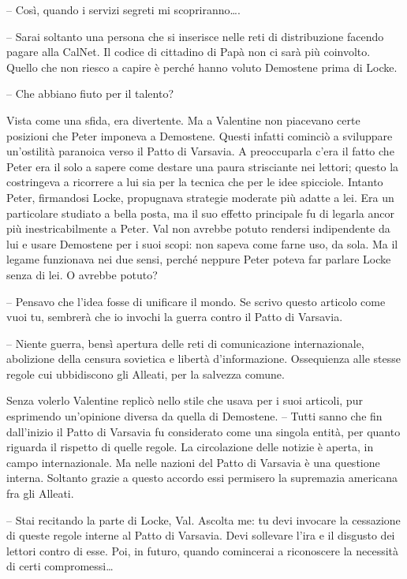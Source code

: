 {-- Così, quando i servizi segreti mi scopriranno\ldots.}

{-- Sarai soltanto una persona che si inserisce nelle reti di
	distribuzione facendo pagare alla CalNet. Il codice di cittadino di Papà
	non ci sarà più coinvolto. Quello che non riesco a capire è perché hanno
	voluto Demostene prima di Locke.}

{-- Che abbiano fiuto per il talento?}

{Vista come una sfida, era divertente. Ma a Valentine non piacevano
	certe posizioni che Peter imponeva a Demostene. Questi infatti cominciò
	a sviluppare un'ostilità paranoica verso il Patto di Varsavia. A
	preoccuparla c'era il fatto che Peter era il solo a sapere come destare
	una paura strisciante nei lettori; questo la costringeva a ricorrere a
	lui sia per la tecnica che per le idee spicciole. Intanto Peter,
	firmandosi Locke, propugnava strategie moderate più adatte a lei. Era un
	particolare studiato a bella posta, ma il suo effetto principale fu di
	legarla ancor più inestricabilmente a Peter. Val non avrebbe potuto
	rendersi indipendente da lui e usare Demostene per i suoi scopi: non
	sapeva come farne uso, da sola. Ma il legame funzionava nei due sensi,
	perché neppure Peter poteva far parlare Locke senza di lei. O avrebbe
	potuto?}

{-- Pensavo che l'idea fosse di unificare il mondo. Se scrivo questo
	articolo come vuoi tu, sembrerà che io invochi la guerra contro il Patto
	di Varsavia.}

{-- Niente guerra, bensì apertura delle reti di comunicazione
	internazionale, abolizione della censura sovietica e libertà
	d'informazione. Ossequienza alle stesse regole cui ubbidiscono gli
	Alleati, per la salvezza comune.}

{Senza volerlo Valentine replicò nello stile che usava per i suoi
	articoli, pur esprimendo un'opinione diversa da quella di Demostene. --
	Tutti sanno che fin dall'inizio il Patto di Varsavia fu considerato come
	una singola entità, per quanto riguarda il rispetto di quelle regole. La
	circolazione delle notizie è aperta, in campo internazionale. Ma nelle
	nazioni del Patto di Varsavia è una questione interna. Soltanto grazie a
	questo accordo essi permisero la supremazia americana fra gli Alleati.}

{-- Stai recitando la parte di Locke, Val. Ascolta me: tu devi invocare
	la cessazione di queste regole interne al Patto di Varsavia. Devi
	sollevare l'ira e il disgusto dei lettori contro di esse. Poi, in
	futuro, quando comincerai a riconoscere la necessità di certi
	compromessi\ldots{}}

